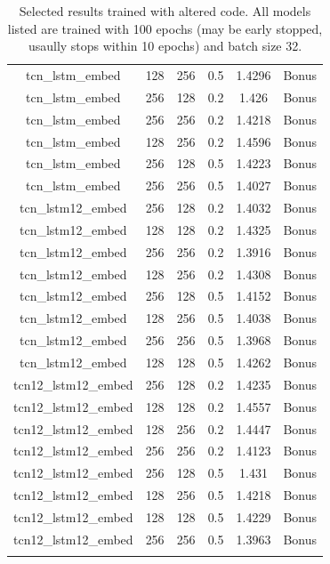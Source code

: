 \documentclass[12pt]{article}
\begin{document}
\begin{longtable}[c]{@{}>{\ttfamily}cccccc@{}}
	tcn\_lstm\_embed     & 128            & 256         & 0.5          & 1.4296   & Bonus \\
	tcn\_lstm\_embed     & 256            & 128         & 0.2          & 1.426    & Bonus \\
	tcn\_lstm\_embed     & 256            & 256         & 0.2          & 1.4218   & Bonus \\
	tcn\_lstm\_embed     & 128            & 256         & 0.2          & 1.4596   & Bonus \\
	tcn\_lstm\_embed     & 256            & 128         & 0.5          & 1.4223   & Bonus \\
	tcn\_lstm\_embed     & 256            & 256         & 0.5          & 1.4027   & Bonus \\\midrule
	tcn\_lstm12\_embed   & 256            & 128         & 0.2          & 1.4032   & Bonus \\
	tcn\_lstm12\_embed   & 128            & 128         & 0.2          & 1.4325   & Bonus \\
	tcn\_lstm12\_embed   & 256            & 256         & 0.2          & 1.3916   & Bonus \\
	tcn\_lstm12\_embed   & 128            & 256         & 0.2          & 1.4308   & Bonus \\
	tcn\_lstm12\_embed   & 256            & 128         & 0.5          & 1.4152   & Bonus \\
	tcn\_lstm12\_embed   & 128            & 256         & 0.5          & 1.4038   & Bonus \\
	tcn\_lstm12\_embed   & 256            & 256         & 0.5          & 1.3968   & Bonus \\
	tcn\_lstm12\_embed   & 128            & 128         & 0.5          & 1.4262   & Bonus \\\midrule
	tcn12\_lstm12\_embed & 256            & 128         & 0.2          & 1.4235   & Bonus \\
	tcn12\_lstm12\_embed & 128            & 128         & 0.2          & 1.4557   & Bonus \\
	tcn12\_lstm12\_embed & 128            & 256         & 0.2          & 1.4447   & Bonus \\
	tcn12\_lstm12\_embed & 256            & 256         & 0.2          & 1.4123   & Bonus \\
	tcn12\_lstm12\_embed & 256            & 128         & 0.5          & 1.431    & Bonus \\
	tcn12\_lstm12\_embed & 128            & 256         & 0.5          & 1.4218   & Bonus \\
	tcn12\_lstm12\_embed & 128            & 128         & 0.5          & 1.4229   & Bonus \\
	tcn12\_lstm12\_embed & 256            & 256         & 0.5          & 1.3963   & Bonus \\* \bottomrule
	\caption{Selected results trained with altered code. All models listed are trained with 100 epochs (may be early stopped, usaully stops within 10 epochs) and batch size 32.}
	\label{tb:ph2-results}
\end{longtable}
\end{document}
